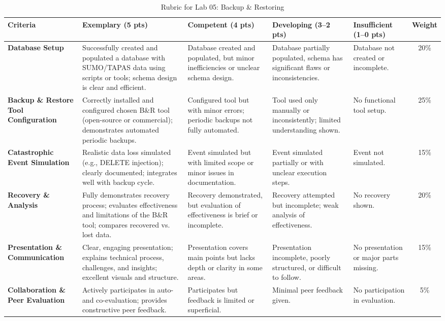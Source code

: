 \documentclass[10pt, landscape]{article}
\begin{document}
\begin{table}
\centering
\caption{Rubric for Lab 05: Backup \& Restoring}
\label{tab:lab05-rubric}
\begin{tabular}{@{}p{4cm}p{5cm}p{5cm}p{4cm}p{4cm}c@{}}
\toprule
\textbf{Criteria} & \textbf{Exemplary (5 pts)} & \textbf{Competent (4 pts)} & \textbf{Developing (3--2 pts)} & \textbf{Insufficient (1--0 pts)} & \textbf{Weight} \\ \midrule
\textbf{Database Setup} & Successfully created and populated a database with SUMO/TAPAS data using scripts or tools; schema design is clear and efficient. & Database created and populated, but minor inefficiencies or unclear schema design. & Database partially populated, schema has significant flaws or inconsistencies. & Database not created or incomplete. & 20\% \\ \midrule
\textbf{Backup \& Restore Tool Configuration} & Correctly installed and configured chosen B\&R tool (open-source or commercial); demonstrates automated periodic backups. & Configured tool but with minor errors; periodic backups not fully automated. & Tool used only manually or inconsistently; limited understanding shown. & No functional tool setup. & 25\% \\ \midrule
\textbf{Catastrophic Event Simulation} & Realistic data loss simulated (e.g., DELETE injection); clearly documented; integrates well with backup cycle. & Event simulated but with limited scope or minor issues in documentation. & Event simulated partially or with unclear execution steps. & Event not simulated. & 15\% \\ \midrule
\textbf{Recovery \& Analysis} & Fully demonstrates recovery process; evaluates effectiveness and limitations of the B\&R tool; compares recovered vs. lost data. & Recovery demonstrated, but evaluation of effectiveness is brief or incomplete. & Recovery attempted but incomplete; weak analysis of effectiveness. & No recovery shown. & 20\% \\ \midrule
\textbf{Presentation \& Communication} & Clear, engaging presentation; explains technical process, challenges, and insights; excellent visuals and structure. & Presentation covers main points but lacks depth or clarity in some areas. & Presentation incomplete, poorly structured, or difficult to follow. & No presentation or major parts missing. & 15\% \\ \midrule
\textbf{Collaboration \& Peer Evaluation} & Actively participates in auto- and co-evaluation; provides constructive peer feedback. & Participates but feedback is limited or superficial. & Minimal peer feedback given. & No participation in evaluation. & 5\% \\ \bottomrule
\end{tabular}%
\end{table}
\end{document}
